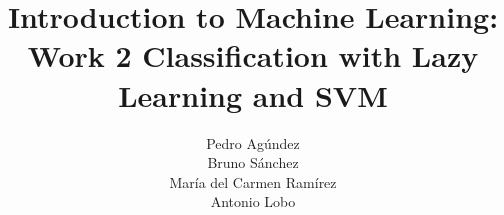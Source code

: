 \documentclass{article}
\title{Introduction to Machine Learning: Work 2 Classification with Lazy Learning and SVM}
\author{
    Pedro Agúndez \\
    Bruno Sánchez \\
    María del Carmen Ramírez \\
    Antonio Lobo
}
\begin{document}
\maketitle

\begin{abstract}
 
\end{abstract}

 

 






\end{document}
